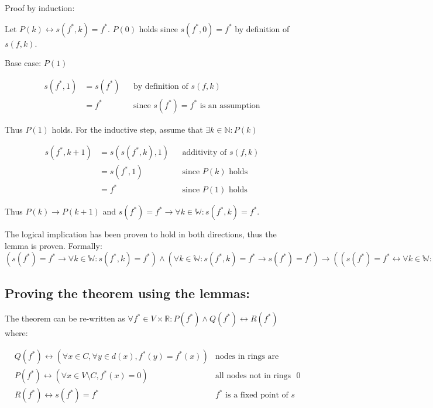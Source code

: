 \documentclass[11pt]{article}
\begin{document}
Proof by induction:

Let $P(k) \leftrightarrow s(f^{*},k) = f^{*}$. $P(0)$ holds since $s(f^{*},0) = f^{*}$ by definition of $s(f,k)$.

Base case: $P(1)$

\begin{align*}
    \text{$s(f^{*},1)$} &= \text{$s(f^{*})$} && \text{by definition of $s(f,k)$} \\
    &= \text{$f^{*}$} && \text{since $s(f^{*})=f^{*}$ is an assumption}
\end{align*}

Thus $P(1)$ holds. For the inductive step, assume that $\exists k \in \mathbb{N}: P(k)$

\begin{align*}
    \text{$s(f^{*},k+1)$} &= \text{$s(s(f^{*},k),1)$} && \text{additivity of $s(f,k)$} \\
    &= \text{$s(f^{*},1)$} && \text{since $P(k)$ holds} \\
    &= \text{$f^{*}$} && \text{since $P(1)$ holds}
\end{align*}

Thus $P(k) \rightarrow P(k+1)$ and $s(f^{*}) = f^{*} \rightarrow \forall k \in \mathbb{W}: s(f^{*},k) = f^{*}$.

The logical implication has been proven to hold in both directions, thus the lemma is proven. Formally:
$(s(f^{*}) = f^{*} \rightarrow \forall k \in \mathbb{W}: s(f^{*},k) = f^{*}) \land (\forall k \in \mathbb{W}: s(f^{*},k) = f^{*} \rightarrow s(f^{*}) = f^{*}) \rightarrow ((s(f^{*}) = f^{*} \leftrightarrow \forall k \in \mathbb{W}: s(f^{*},k) = f^{*}))$

\subsection{Proving the theorem using the lemmas:}

The theorem can be re-written as $\forall f^{*} \in V \times \mathbb{R}: P(f^{*}) \land Q(f^{*}) \leftrightarrow R(f^{*})$ where:

\begin{align*}
& \text{$Q(f^{*}) \leftrightarrow (\forall x\in C, \forall y\in d(x), f^{*}(y) = f^{*}(x) )$} & \text{nodes in rings are mapped to same value} \\
& \text{$P(f^{*}) \leftrightarrow (\forall x\in V\setminus C, f^{*}(x) = 0)$} & \text{all nodes not in rings are mapped to $0$} \\
& \text{$R(f^{*}) \leftrightarrow s(f^{*}) = f^{*}$} & \text{$f^{*}$ is a fixed point of $s$}
\end{align*}
\end{document}
